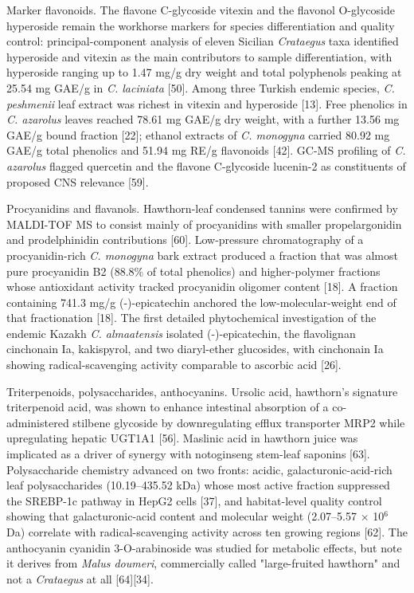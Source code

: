 \documentclass[11pt]{article}
\begin{document}
Marker flavonoids. The flavone C-glycoside vitexin and the flavonol O-glycoside hyperoside remain the workhorse markers for species differentiation and quality control: principal-component analysis of eleven Sicilian \emph{Crataegus} taxa identified hyperoside and vitexin as the main contributors to sample differentiation, with hyperoside ranging up to 1.47 mg/g dry weight and total polyphenols peaking at 25.54 mg GAE/g in \emph{C. laciniata} [50]. Among three Turkish endemic species, \emph{C. peshmenii} leaf extract was richest in vitexin and hyperoside [13]. Free phenolics in \emph{C. azarolus} leaves reached 78.61 mg GAE/g dry weight, with a further 13.56 mg GAE/g bound fraction [22]; ethanol extracts of \emph{C. monogyna} carried 80.92 mg GAE/g total phenolics and 51.94 mg RE/g flavonoids [42]. GC-MS profiling of \emph{C. azarolus} flagged quercetin and the flavone C-glycoside lucenin-2 as constituents of proposed CNS relevance [59].

Procyanidins and flavanols. Hawthorn-leaf condensed tannins were confirmed by MALDI-TOF MS to consist mainly of procyanidins with smaller propelargonidin and prodelphinidin contributions [60]. Low-pressure chromatography of a procyanidin-rich \emph{C. monogyna} bark extract produced a fraction that was almost pure procyanidin B2 (88.8\% of total phenolics) and higher-polymer fractions whose antioxidant activity tracked procyanidin oligomer content [18]. A fraction containing 741.3 mg/g (-)-epicatechin anchored the low-molecular-weight end of that fractionation [18]. The first detailed phytochemical investigation of the endemic Kazakh \emph{C. almaatensis} isolated (-)-epicatechin, the flavolignan cinchonain Ia, kakispyrol, and two diaryl-ether glucosides, with cinchonain Ia showing radical-scavenging activity comparable to ascorbic acid [26].

Triterpenoids, polysaccharides, anthocyanins. Ursolic acid, hawthorn's signature triterpenoid acid, was shown to enhance intestinal absorption of a co-administered stilbene glycoside by downregulating efflux transporter MRP2 while upregulating hepatic UGT1A1 [56]. Maslinic acid in hawthorn juice was implicated as a driver of synergy with notoginseng stem-leaf saponins [63]. Polysaccharide chemistry advanced on two fronts: acidic, galacturonic-acid-rich leaf polysaccharides (10.19--435.52 kDa) whose most active fraction suppressed the SREBP-1c pathway in HepG2 cells [37], and habitat-level quality control showing that galacturonic-acid content and molecular weight (2.07--5.57 $\times$ 10$^6$ Da) correlate with radical-scavenging activity across ten growing regions [62]. The anthocyanin cyanidin 3-O-arabinoside was studied for metabolic effects, but note it derives from \emph{Malus doumeri}, commercially called "large-fruited hawthorn" and not a \emph{Crataegus} at all [64][34].
\end{document}

